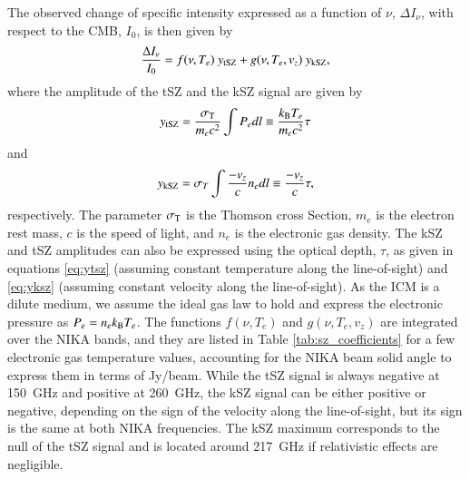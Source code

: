 \documentclass[twocolumn,traditabstract]{aa}
\begin{document}
The observed change of specific intensity expressed as a function of $\nu$, $\Delta I_{\nu}$, with respect to the CMB, $I_0$, is then given by 
\begin{equation}
	\frac{\Delta I_{\nu}}{I_0} = f(\nu, T_e) \ y_{\rm tSZ} + g(\nu, T_e, v_z) \ y_{\rm kSZ},
\label{eq:dIsz}
\end{equation}
where the amplitude of the tSZ and the kSZ signal are given by
\begin{equation}
	y_{\rm tSZ} = \frac{\sigma_{\rm T}}{m_e c^2} \int P_e dl \equiv \frac{k_{\rm B} T_e}{m_e c^2} \tau
\label{eq:ytsz}
\end{equation}
and
\begin{equation}
	y_{\rm kSZ} = \sigma_T \int \frac{-v_z}{c} n_e dl \equiv \frac{-v_z}{c} \tau,
\label{eq:yksz}
\end{equation}
respectively. The parameter $\sigma_{\rm T}$ is the Thomson cross Section, $m_e$ is the electron rest mass, $c$ is the speed of light, and $n_e$ is the electronic gas density. The kSZ and tSZ amplitudes can also be expressed using the optical depth, $\tau$, as given in equations \ref{eq:ytsz} (assuming constant temperature along the line-of-sight) and \ref{eq:yksz} (assuming constant velocity along the line-of-sight). As the ICM is a dilute medium, we assume the ideal gas law to hold and express the electronic pressure as $P_e = n_e k_{\rm B} T_e$. The functions $f(\nu, T_e)$ and $g(\nu, T_e, v_z)$ are integrated over the NIKA bands, and they are listed in Table \ref{tab:sz_coefficients} for a few electronic gas temperature values, accounting for the NIKA beam solid angle to express them in terms of Jy/beam. While the tSZ signal is always negative at 150~GHz and positive at 260~GHz, the kSZ signal can be either positive or negative, depending on the sign of the velocity along the line-of-sight, but its sign is the same at both NIKA frequencies. The kSZ maximum corresponds to the null of the tSZ signal and is located around 217~GHz if relativistic effects are negligible.


\end{document}

